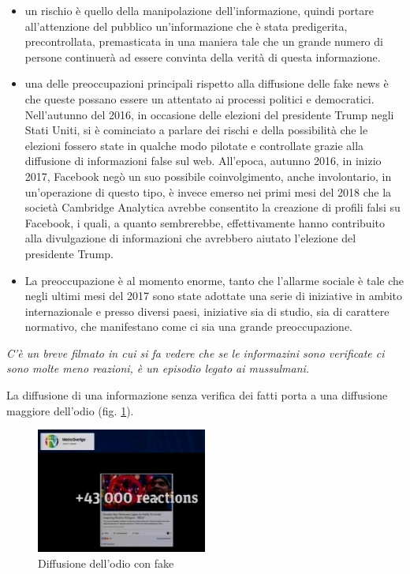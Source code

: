 \begin{itemize}
    \item un rischio è quello della manipolazione dell'informazione, quindi portare all'attenzione del pubblico un'informazione che è stata predigerita, precontrollata, premasticata in una maniera tale che un grande numero di persone continuerà ad essere convinta della verità di questa informazione.
    \item una delle preoccupazioni principali rispetto alla diffusione delle fake news è che queste possano essere un attentato ai processi politici e democratici. Nell'autunno del 2016, in occasione delle elezioni del presidente Trump negli Stati Uniti, si è cominciato a parlare dei rischi e della possibilità che le elezioni fossero state in qualche modo pilotate e controllate grazie alla diffusione di informazioni false sul web. All'epoca, autunno 2016, in inizio 2017, Facebook negò un suo possibile coinvolgimento, anche involontario, in un'operazione di questo tipo, è invece emerso nei primi mesi del 2018 che la società Cambridge Analytica avrebbe consentito la creazione di profili falsi su Facebook, i quali, a quanto sembrerebbe, effettivamente hanno contribuito alla divulgazione di informazioni che avrebbero aiutato l'elezione del presidente Trump.
    \item  La preoccupazione è al momento enorme, tanto che l'allarme sociale è tale che negli ultimi mesi del 2017 sono state adottate una serie di iniziative in ambito internazionale e presso diversi paesi, iniziative sia di studio, sia  di carattere normativo, che manifestano come ci sia una grande preoccupazione.
\end{itemize}

\textit{C'è un breve filmato in cui si fa vedere che se le informazini sono verificate ci sono molte meno reazioni, è un episodio legato ai mussulmani.}

La diffusione di una informazione senza verifica dei fatti porta a una diffusione maggiore dell'odio (fig. \ref{fig:fake_odio}). 

\begin{figure}[h]
    \centering
    \includegraphics[width=0.5\textwidth]{images/10_lez_fig_02}
    \caption{Diffusione dell'odio con fake}
    \label{fig:fake_odio}
\end{figure}

